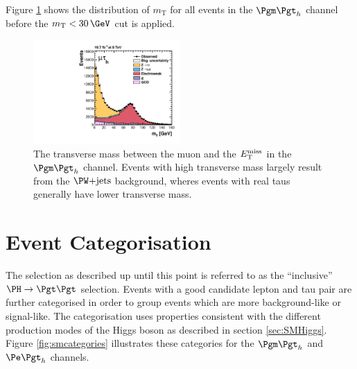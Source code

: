 Figure \ref{fig:transversemass} shows the distribution of $m_{\text{T}}$ for all
events in the $\mutau$ channel before the $m_{\text{T}}<30\,\GeV$ cut is
applied.

\begin{figure}[htb]
\begin{center}
    \includegraphics[width=0.5\textwidth]
      {plots/htt-sm/mt_1_inclusive_mt_2012.pdf}

\end{center}
\caption[The transverse mass between the muon and the $\MET$ in the $\mutau$ channel.]{
 The transverse mass between the muon and the $\MET$ in the $\mutau$ channel.
 Events with high transverse mass largely result from the $\WJets$ background,
 wheres events with real taus generally have lower transverse mass.
}
\label{fig:transversemass}
\end{figure}


\section{Event Categorisation}
\label{sec:eventcategorisation}

The selection as described up until this point is referred to as the
``inclusive'' $\HToTauTau$ selection. 
Events with a good candidate lepton and tau pair are further categorised in
order to group events which are more background-like or signal-like. The
categorisation uses properties consistent with the different production modes of
the Higgs boson as described in section \ref{sec:SMHiggs}. Figure
\ref{fig:smcategories} illustrates these categories for the $\mutau$ and $\etau$
channels.

